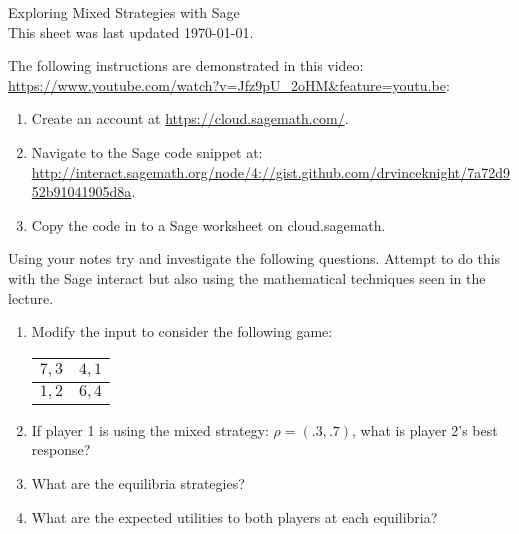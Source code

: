 \documentclass[12pt]{article}
\begin{document}
\begin{center}
\Huge{Exploring Mixed Strategies with Sage\\\tiny{This sheet was last updated \today.} }
\end{center}

The following instructions are demonstrated in this video: \url{https://www.youtube.com/watch?v=Jfz9pU_2oHM&feature=youtu.be}:

\begin{enumerate}
    \item Create an account at \url{https://cloud.sagemath.com/}.
    \item Navigate to the Sage code snippet at: \url{http://interact.sagemath.org/node/4://gist.github.com/drvinceknight/7a72d952b91041905d8a}.
    \item Copy the code in to a Sage worksheet on cloud.sagemath.
\end{enumerate}

Using your notes try and investigate the following questions. Attempt to do this with the Sage interact but also using the mathematical techniques seen in the lecture.


\begin{enumerate}
\item Modify the input to consider the following game:
\begin{center}
\begin{tabular}{|c|c|}
\hline
$7,3$&$4,1$\\\hline
$1,2$&$6,4$\\
\hline
\end{tabular}
\end{center}
\item If player 1 is using the mixed strategy: $\rho=(.3,.7)$, what is player 2's best response?
\item What are the equilibria strategies?
\item What are the expected utilities to both players at each equilibria?
\end{enumerate}
\end{document}
